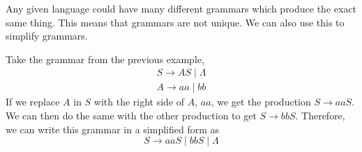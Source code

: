 Any given language could have many different grammars which produce the exact same thing. This means that grammars are
 not unique. We can also use this to simplify grammars.

\begin{example*}{}{}
  Take the grammar from the previous example,
  \begin{gather*}
    S \rightarrow AS \mid \Lambda\\
    A \rightarrow aa \mid bb
  \end{gather*}
  If we replace $A$ in $S$ with the right side of $A$, $aa$, we get the production $S \rightarrow aaS$. We can then do
   the same with the other production to get $S \rightarrow bbS$. Therefore, we can write this grammar in a simplified
   form as
  \begin{equation*}
    S \rightarrow aaS \mid bbS \mid \Lambda
  \end{equation*}
\end{example*}